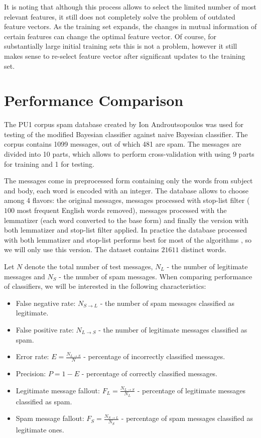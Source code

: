 \documentclass[12pt]{report}
\begin{document}
It is noting that although this process allows to select the limited number of most relevant features, it still does not completely solve the problem of outdated feature vectors. As the training set expands, the changes in mutual information of certain features can change the optimal feature vector. Of course, for substantially large initial training sets this is not a problem, however it still makes sense to re-select feature vector after significant updates to the training set.

\newpage


\chapter{Performance Comparison}

The PU1 corpus spam database created by Ion Androutsopoulos \cite{Androutsopoulos} was used for testing of the modified Bayesian classifier against naive Bayesian classifier. The corpus contains 1099 messages, out of which 481 are spam. The messages are divided into 10 parts, which allows to perform cross-validation with using 9 parts for training and 1 for testing.

The messages come in preprocessed form containing only the words from subject and body, each word is encoded with an integer. The database allows to choose among 4 flavors: the original messages, messages processed with stop-list filter ($100$ most frequent English words removed), messages processed with the  lemmatizer (each word converted to the base form) and finally the version with both lemmatizer and stop-list filter applied. In practice the database processed with both lemmatizer and stop-list performs best for most of the algorithms \cite{Tretyakov}, so we will only use this version. The dataset contains $21611$ distinct words.

Let $N$ denote the total number of test messages, $N_L$ - the number of legitimate messages and $N_S$ - the number of spam messages. When comparing performance of classifiers, we will be interested in the following characteristics:

\begin{itemize}
	\item False negative rate: $N_{S \rightarrow L}$ - the number of spam messages classified as legitimate.
	\item False positive rate: $N_{L \rightarrow S}$ - the number of legitimate messages classified as spam.
	\item Error rate: $E = \frac{N_{L \rightarrow S}}{N}$ - percentage of incorrectly classified messages.
	\item Precision: $P = 1 - E$ - percentage of correctly classified messages.
	\item Legitimate message fallout: $F_L = \frac{N_{L \rightarrow S}}{N_L}$ - percentage  of legitimate messages classified as spam.
	\item Spam message fallout: $F_S = \frac{N_{S \rightarrow L}}{N_S}$ - percentage of spam messages classified as legitimate ones.
\end{itemize}
\end{document}

